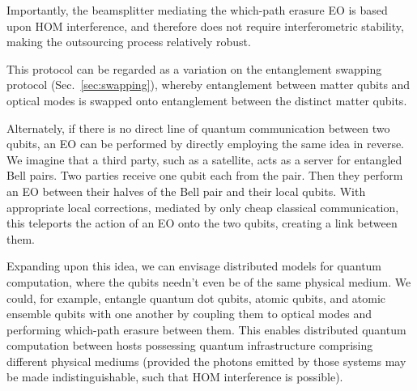 \documentclass[aps, rmp, twocolumn, amsmath, amssymb, nofootinbib, superscriptaddress, longbibliography, floatfix, table-of-contents, eqsecnum]{revtex4-1}
\begin{document}
Importantly, the beamsplitter mediating the which-path erasure EO is based upon HOM interference, and therefore does not require interferometric stability, making the outsourcing process relatively robust.

This protocol can be regarded as a variation on the entanglement swapping protocol (Sec.~\ref{sec:swapping}), whereby entanglement between matter qubits and optical modes is swapped onto entanglement between the distinct matter qubits.

Alternately, if there is no direct line of quantum communication between two qubits, an EO can be performed by directly employing the same idea in reverse. We imagine that a third party, such as a satellite, acts as a server for entangled Bell pairs. Two parties receive one qubit each from the pair. Then they perform an EO between their halves of the Bell pair and their local qubits. With appropriate local corrections, mediated by only cheap classical communication, this teleports the action of an EO onto the two qubits, creating a link between them.

Expanding upon this idea, we can envisage distributed models for quantum computation, where the qubits needn't even be of the same physical medium. We could, for example, entangle quantum dot qubits, atomic qubits, and atomic ensemble qubits with one another by coupling them to optical modes and performing which-path erasure between them. This enables distributed quantum computation between hosts possessing quantum infrastructure comprising different physical mediums (provided the photons emitted by those systems may be made indistinguishable, such that HOM interference is possible).
\end{document}
